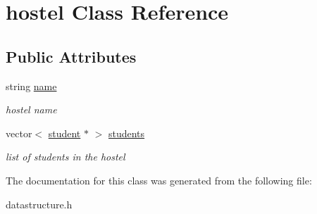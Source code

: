 \hypertarget{classhostel}{\section{hostel \-Class \-Reference}
\label{classhostel}
}
\subsection*{\-Public \-Attributes}
\begin{DoxyCompactItemize}
\item 
\hypertarget{classhostel_ac4478348f808d7ae24482171e415d12c}{string \hyperlink{classhostel_ac4478348f808d7ae24482171e415d12c}{name}}\label{classhostel_ac4478348f808d7ae24482171e415d12c}

\begin{DoxyCompactList}\small\item\em hostel name \end{DoxyCompactList}\item 
\hypertarget{classhostel_a79b5f58882300f23c489139da88be101}{vector$<$ \hyperlink{classstudent}{student} $\ast$ $>$ \hyperlink{classhostel_a79b5f58882300f23c489139da88be101}{students}}\label{classhostel_a79b5f58882300f23c489139da88be101}

\begin{DoxyCompactList}\small\item\em list of students in the hostel \end{DoxyCompactList}\end{DoxyCompactItemize}


\-The documentation for this class was generated from the following file\-:\begin{DoxyCompactItemize}
\item 
datastructure.\-h\end{DoxyCompactItemize}
